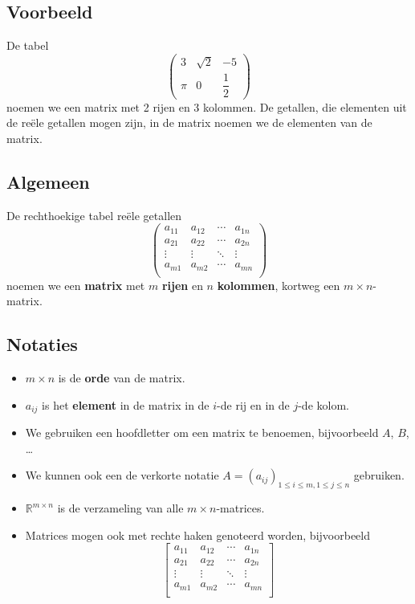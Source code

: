 \documentclass[12pt,twoside]{article}
\begin{document}
\subsection{Voorbeeld}

De tabel
$$\begin{pmatrix}3 & \sqrt{2} & -5\\ \pi & 0 & \dfrac{1}{2}\end{pmatrix}$$
noemen we een matrix met 2 rijen en 3 kolommen. De getallen, die elementen uit de reële getallen mogen zijn, in de matrix noemen we de elementen van de matrix.

\subsection{Algemeen}

De rechthoekige tabel reële getallen
$$
\begin{pmatrix}
  a_{11} & a_{12} & \cdots & a_{1n} \\
  a_{21} & a_{22} & \cdots & a_{2n} \\
  \vdots      & \vdots      & \ddots & \vdots      \\
  a_{m1} & a_{m2} & \cdots & a_{mn} \\
\end{pmatrix}
$$
noemen we een {\bf matrix} met $m$ {\bf rijen} en $n$ {\bf kolommen}, kortweg een $m \times n$-matrix.

\subsection{Notaties}
\begin{itemize}
\item $m \times n$ is de {\bf orde} van de matrix.
\item $a_{ij}$ is het {\bf element} in de matrix in de $i$-de rij en in de $j$-de kolom.
\item We gebruiken een hoofdletter om een matrix te benoemen, bijvoorbeeld $A$, $B$, \ldots
\item We kunnen ook een de verkorte notatie $A=(a_{ij})_{1 \leq i \leq m , 1 \leq j \leq n}$ gebruiken.
\item $\mathbb{R}^{m \times n}$ is de verzameling van alle $m \times n$-matrices.
\item Matrices mogen ook met rechte haken genoteerd worden, bijvoorbeeld
$$
\begin{bmatrix}
  a_{11} & a_{12} & \cdots & a_{1n} \\
  a_{21} & a_{22} & \cdots & a_{2n} \\
  \vdots      & \vdots      & \ddots & \vdots      \\
  a_{m1} & a_{m2} & \cdots & a_{mn} \\
\end{bmatrix}
$$
\end{itemize}
\end{document}
